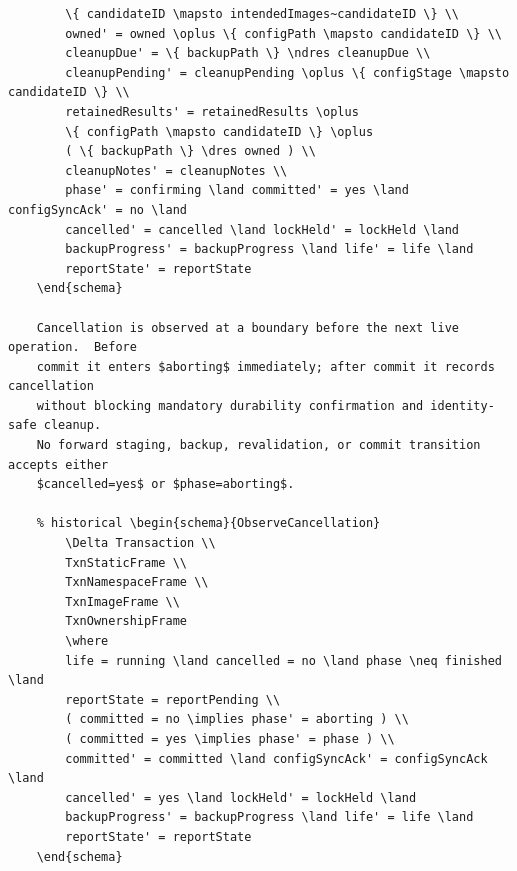\documentclass{article}
\begin{document}
\begin{verbatim}
		\{ candidateID \mapsto intendedImages~candidateID \} \\
		owned' = owned \oplus \{ configPath \mapsto candidateID \} \\
		cleanupDue' = \{ backupPath \} \ndres cleanupDue \\
		cleanupPending' = cleanupPending \oplus \{ configStage \mapsto candidateID \} \\
		retainedResults' = retainedResults \oplus
		\{ configPath \mapsto candidateID \} \oplus
		( \{ backupPath \} \dres owned ) \\
		cleanupNotes' = cleanupNotes \\
		phase' = confirming \land committed' = yes \land configSyncAck' = no \land
		cancelled' = cancelled \land lockHeld' = lockHeld \land
		backupProgress' = backupProgress \land life' = life \land
		reportState' = reportState
	\end{schema}

	Cancellation is observed at a boundary before the next live operation.  Before
	commit it enters $aborting$ immediately; after commit it records cancellation
	without blocking mandatory durability confirmation and identity-safe cleanup.
	No forward staging, backup, revalidation, or commit transition accepts either
	$cancelled=yes$ or $phase=aborting$.

	% historical \begin{schema}{ObserveCancellation}
		\Delta Transaction \\
		TxnStaticFrame \\
		TxnNamespaceFrame \\
		TxnImageFrame \\
		TxnOwnershipFrame
		\where
		life = running \land cancelled = no \land phase \neq finished \land
		reportState = reportPending \\
		( committed = no \implies phase' = aborting ) \\
		( committed = yes \implies phase' = phase ) \\
		committed' = committed \land configSyncAck' = configSyncAck \land
		cancelled' = yes \land lockHeld' = lockHeld \land
		backupProgress' = backupProgress \land life' = life \land
		reportState' = reportState
	\end{schema}


\end{verbatim}
\end{document}
